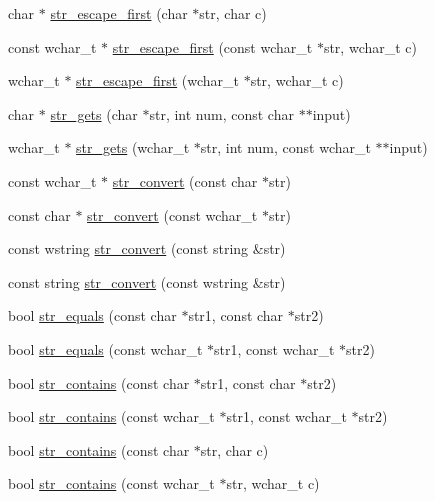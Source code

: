 \begin{DoxyCompactItemize}
\item 
char $\ast$ \hyperlink{namespacemage_a7a7fa3e9439ddbe1f31fe888a2a70e3d}{str\+\_\+escape\+\_\+first} (char $\ast$str, char c)
\item 
const wchar\+\_\+t $\ast$ \hyperlink{namespacemage_ac47b9d026e0ddda47b3d889beb40a2d9}{str\+\_\+escape\+\_\+first} (const wchar\+\_\+t $\ast$str, wchar\+\_\+t c)
\item 
wchar\+\_\+t $\ast$ \hyperlink{namespacemage_a8fbccb44f38a2e8b09baf805e9f34fc1}{str\+\_\+escape\+\_\+first} (wchar\+\_\+t $\ast$str, wchar\+\_\+t c)
\item 
char $\ast$ \hyperlink{namespacemage_ab7f63cc8e67ba97382747bc75fd75f62}{str\+\_\+gets} (char $\ast$str, int num, const char $\ast$$\ast$input)
\item 
wchar\+\_\+t $\ast$ \hyperlink{namespacemage_a881ab89db7712612531d47a64c6dfaa1}{str\+\_\+gets} (wchar\+\_\+t $\ast$str, int num, const wchar\+\_\+t $\ast$$\ast$input)
\item 
const wchar\+\_\+t $\ast$ \hyperlink{namespacemage_aba19c96528a59194ebc100244518f608}{str\+\_\+convert} (const char $\ast$str)
\item 
const char $\ast$ \hyperlink{namespacemage_a93f0e3b596ce1156d1fce19967fc316a}{str\+\_\+convert} (const wchar\+\_\+t $\ast$str)
\item 
const wstring \hyperlink{namespacemage_a9a7ff7b35c293ad8f09d5603f78e4c52}{str\+\_\+convert} (const string \&str)
\item 
const string \hyperlink{namespacemage_a5425aab167b483cdf05a6aaf0d074ed1}{str\+\_\+convert} (const wstring \&str)
\item 
bool \hyperlink{namespacemage_a4f78f15f269c1f65d4148983bc8224c5}{str\+\_\+equals} (const char $\ast$str1, const char $\ast$str2)
\item 
bool \hyperlink{namespacemage_a0013423e891bc8f522248a6a3f826681}{str\+\_\+equals} (const wchar\+\_\+t $\ast$str1, const wchar\+\_\+t $\ast$str2)
\item 
bool \hyperlink{namespacemage_a5194c40ccd591a8a8926ad7812abcd09}{str\+\_\+contains} (const char $\ast$str1, const char $\ast$str2)
\item 
bool \hyperlink{namespacemage_aac9609117e428765417683338ae8fa73}{str\+\_\+contains} (const wchar\+\_\+t $\ast$str1, const wchar\+\_\+t $\ast$str2)
\item 
bool \hyperlink{namespacemage_a42025161321117689362691b52994c3f}{str\+\_\+contains} (const char $\ast$str, char c)
\item 
bool \hyperlink{namespacemage_a95501f17ace9d4f4ca8ed15e2559ad23}{str\+\_\+contains} (const wchar\+\_\+t $\ast$str, wchar\+\_\+t c)

\end{DoxyCompactItemize}
